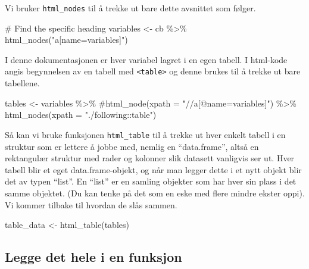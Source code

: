 \documentclass[
  norsk,
  letterpaper,
  DIV=11,
  numbers=noendperiod]{scrreprt}
\newenvironment{Shaded}{\begin{snugshade}}{\end{snugshade}}
\newcommand{\AttributeTok}[1]{\textcolor[rgb]{0.40,0.45,0.13}{#1}}
\newcommand{\CommentTok}[1]{\textcolor[rgb]{0.37,0.37,0.37}{#1}}
\newcommand{\FunctionTok}[1]{\textcolor[rgb]{0.28,0.35,0.67}{#1}}
\newcommand{\NormalTok}[1]{\textcolor[rgb]{0.00,0.23,0.31}{#1}}
\newcommand{\OtherTok}[1]{\textcolor[rgb]{0.00,0.23,0.31}{#1}}
\newcommand{\SpecialCharTok}[1]{\textcolor[rgb]{0.37,0.37,0.37}{#1}}
\newcommand{\StringTok}[1]{\textcolor[rgb]{0.13,0.47,0.30}{#1}}
\theoremstyle{definition}
\theoremstyle{remark}
\begin{document}
Vi bruker \texttt{html\_nodes} til å trekke ut bare dette avsnittet som
følger.

\begin{Shaded}
\begin{Highlighting}[]
\CommentTok{\# Find the specific heading}
\NormalTok{variables }\OtherTok{\textless{}{-}}\NormalTok{ cb }\SpecialCharTok{\%\textgreater{}\%} 
  \FunctionTok{html\_nodes}\NormalTok{(}\StringTok{"a[name=\textquotesingle{}variables\textquotesingle{}]"}\NormalTok{)}
\end{Highlighting}
\end{Shaded}

I denne dokumentasjonen er hver variabel lagret i en egen tabell. I
html-kode angis begynnelsen av en tabell med
\texttt{\textless{}table\textgreater{}} og denne brukes til å trekke ut
bare tabellene.

\begin{Shaded}
\begin{Highlighting}[]
\NormalTok{tables }\OtherTok{\textless{}{-}}\NormalTok{ variables }\SpecialCharTok{\%\textgreater{}\%} 
    \CommentTok{\#html\_node(xpath = "//a[@name=\textquotesingle{}variables\textquotesingle{}]") \%\textgreater{}\% }
    \FunctionTok{html\_nodes}\NormalTok{(}\AttributeTok{xpath =} \StringTok{"./following::table"}\NormalTok{)}
\end{Highlighting}
\end{Shaded}

Så kan vi bruke funksjonen \texttt{html\_table} til å trekke ut hver
enkelt tabell i en struktur som er lettere å jobbe med, nemlig en
``data.frame'', altså en rektangulær struktur med rader og kolonner slik
datasett vanligvis ser ut. Hver tabell blir et eget data.frame-objekt,
og når man legger dette i et nytt objekt blir det av typen ``list''. En
``list'' er en samling objekter som har hver sin plass i det samme
objektet. (Du kan tenke på det som en eske med flere mindre ekster
oppi). Vi kommer tilbake til hvordan de slås sammen.

\begin{Shaded}
\begin{Highlighting}[]
\NormalTok{table\_data }\OtherTok{\textless{}{-}} \FunctionTok{html\_table}\NormalTok{(tables)}
\end{Highlighting}
\end{Shaded}

\subsection{Legge det hele i en
funksjon}\label{legge-det-hele-i-en-funksjon}
\end{document}
